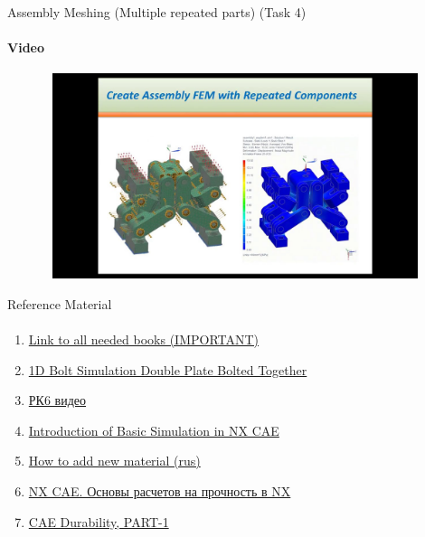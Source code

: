 \documentclass[aspectratio=169]{beamer}
\newcommand{\fbckg}[1]{\usebackgroundtemplate{\texttt{[image: \#1]}}}%
\begin{document}
\begin{frame}[t]{Assembly Meshing (Multiple repeated parts) (Task 4)}
    \framesubtitle{Video}
    \vspace{-0.6cm}
    \begin{figure}[H]
        \href{https://youtu.be/PCvw1kOc5oE}{
            \centering\includegraphics[height=6cm,width=1\textwidth,keepaspectratio]{assembly_meshing_video.jpg}}
        \label{fig:assembly_meshing_video.jpg}
    \end{figure}
\end{frame}

\begin{frame}[t]{Reference Material}
    \framesubtitle{}
    \begin{enumerate}
        \item \href{https://disk.yandex.ru/d/Q6H7la7iLdeh5Q}{Link to all needed books (IMPORTANT)}
        \item \href{https://youtu.be/vBilPNT2POM}{1D Bolt Simulation Double Plate Bolted Together}
        \item \href{https://youtu.be/-iTcEE67jYc}{РК6 видео}
        \item \href{https://youtu.be/xqBRiOuGGfw}{Introduction of Basic Simulation in NX CAE}
        \item \href{https://youtu.be/e0mKgo4m-kk}{How to add new material (rus)}
        \item \href{https://www.youtube.com/playlist?list=PLrlbZU2HDT4n-BPs-EW9x2PCWBDqmRi5H}{NX CAE. Основы расчетов на прочность в NX}
        \item \href{https://youtu.be/1jJtZCUNQNo}{CAE Durability, PART-1}
    \end{enumerate}
    \end{frame}

\fbckg{fibeamer/figs/last_page.png}
\frame[plain]{}
\end{document}
